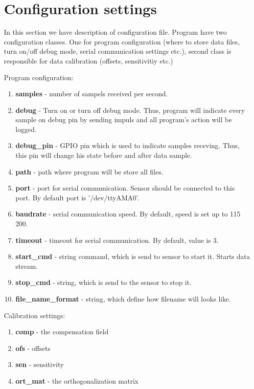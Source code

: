 \documentclass[12pt]{article}
\begin{document}
\section{Configuration settings}
\par In this section we have description of configuration file. Program have two
configuration classes. One for program configuration (where to store data files,
turn on/off debug mode, serial communication settings etc.), second class is
responsible for data calibration (offsets, sensitivitiy etc.)
\par Program configuration:
\begin{enumerate}
    \item \textbf{samples} - number of sampels received per second.
    \item \textbf{debug} - Turn on or turn off debug mode. Thus, program will
        indicate every sample on debug pin by sending impuls and all program's
        action will be logged.
    \item \textbf{debug\_pin} - GPIO pin which is used to indicate samples
        receving. Thus, this pin will change his state before and after data
        sample.
    \item \textbf{path} - path where program will be store all files.
    \item \textbf{port} - port for serial communication. Sensor should be
        connected to this port. By default port is '/dev/ttyAMA0'.
    \item \textbf{baudrate} - serial communication speed. By default, speed is
        set up to 115 200.
    \item \textbf{timeout} - timeout for serial communication. By default, value
        is 3.
    \item \textbf{start\_cmd} - string command, which is send to sensor to start
        it. Starts data stream.
    \item \textbf{stop\_cmd} - string, which is send to the sensor to stop it.
    \item \textbf{file\_name\_format} - string, which define how filename will
        looks like.
\end{enumerate}
\par Calibration settings:
\begin{enumerate}
    \item \textbf{comp} - the compensation field
    \item \textbf{ofs} - offsets
    \item \textbf{sen} - sensitivity
    \item \textbf{ort\_mat} - the orthogonalization matrix
\end{enumerate}
\end{document}
